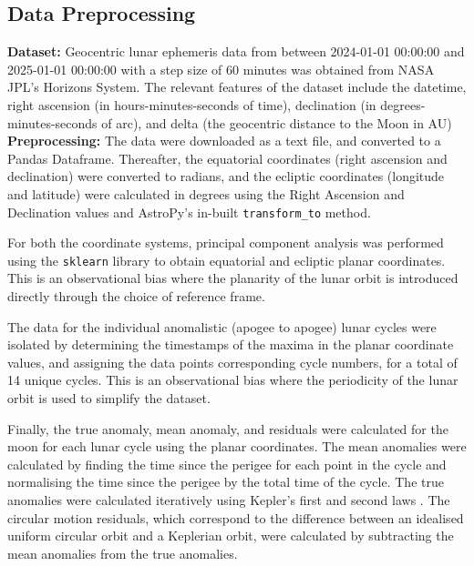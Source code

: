 \documentclass[fleqn,10pt]{olplainarticle}
\numberwithin{equation}{subsection}
\begin{document}

\subsection{Data Preprocessing}\hfill

\textbf{Dataset:} Geocentric lunar ephemeris data from between 2024-01-01 00:00:00 and 2025-01-01 00:00:00 with a step size of 60 minutes was obtained from NASA JPL's Horizons System. The relevant features of the dataset include the datetime, right ascension (in hours-minutes-seconds of time), declination (in degrees-minutes-seconds of arc), and delta (the geocentric distance to the Moon in AU)\\

\textbf{Preprocessing:} The data were downloaded as a text file, and converted to a Pandas Dataframe. Thereafter, the equatorial coordinates (right ascension and declination) were converted to radians, and the ecliptic coordinates (longitude and latitude) were calculated in degrees using the Right Ascension and Declination values and AstroPy's in-built \lstinline{transform_to} method.

For both the coordinate systems, principal component analysis was performed using the \lstinline{sklearn} library to obtain equatorial and ecliptic planar coordinates. This is an observational bias where the planarity of the lunar orbit is introduced directly through the choice of reference frame.

The data for the individual anomalistic (apogee to apogee) lunar cycles were isolated by determining the timestamps of the maxima in the planar coordinate values, and assigning the data points corresponding cycle numbers, for a total of 14 unique cycles. This is an observational bias where the periodicity of the lunar orbit is used to simplify the dataset.

Finally, the true anomaly, mean anomaly, and residuals were calculated for the moon for each lunar cycle using the planar coordinates. The mean anomalies were calculated by finding the time since the perigee for each point in the cycle and normalising the time since the perigee by the total time of the cycle. The true anomalies were calculated iteratively using Kepler's first and second laws \cite{brown1896introductory}. The circular motion residuals, which correspond to the difference between an idealised uniform circular orbit and a Keplerian orbit, were calculated by subtracting the mean anomalies from the true anomalies.
\end{document}
